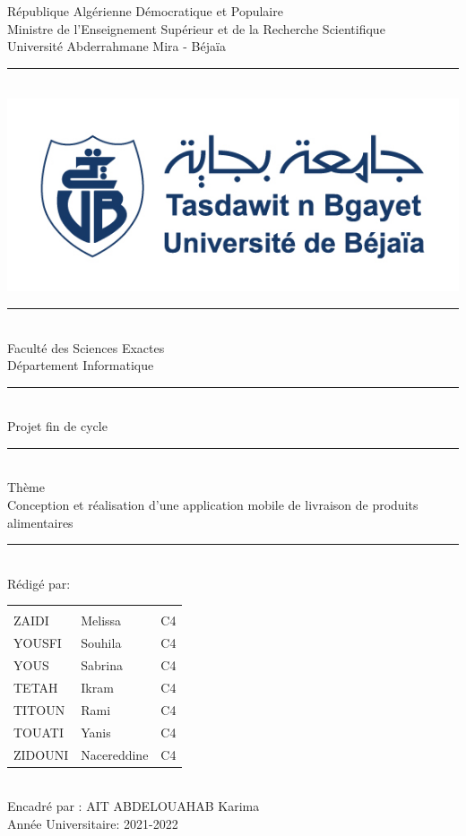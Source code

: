 \documentclass{report}
\begin{document}
\begin{center}
République Algérienne Démocratique et Populaire\\
Ministre de l'Enseignement Supérieur et de la Recherche Scientifique\\
Université Abderrahmane Mira - Béjaïa\\
\rule{0.75\textwidth}{1 pt}\\
\includegraphics[scale=0.7]{logo.jpg}\\
\rule{0.75\textwidth}{1pt}\\[0.25 cm]
Faculté des Sciences Exactes\\
Département Informatique\\
\rule{0.75\textwidth}{1pt}\\[0.5 cm]
\LARGE Projet fin de cycle\\
\rule{0.95\textwidth}{2 pt}\\
\Large Thème\\
\Large Conception et réalisation d’une application mobile de livraison de produits alimentaires\\
\rule{0.95\textwidth}{2 pt}\\[1 cm]
Rédigé par:\\[0.5 cm]
\begin{tabular}{lll}
\hline\hline\\
ZAIDI & Melissa & C4\\
YOUSFI & Souhila & C4\\
YOUS & Sabrina & C4\\
TETAH & Ikram & C4\\
TITOUN & Rami & C4\\
TOUATI & Yanis & C4\\
ZIDOUNI & Nacereddine & C4\\[1 cm]
\end{tabular}\\
Encadré par : AIT ABDELOUAHAB Karima\\[1 cm]
Année Universitaire: 2021-2022
\end{center}
\thispagestyle{empty}
\newpage
\end{document}

